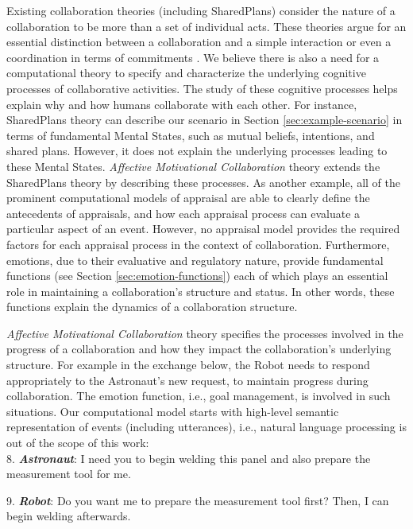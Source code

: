 \documentclass[12pt]{report}
\begin{document}
Existing collaboration theories (including SharedPlans) consider the nature of a
collaboration to be more than a set of individual acts. These theories argue for
an essential distinction between a collaboration and a simple interaction or
even a coordination in terms of commitments \cite{grosz:shared-plans,
lochbaum:collaborative-planning}. We believe there is also a need for a
computational theory to specify and characterize the underlying cognitive
processes of collaborative activities. The study of these cognitive processes
helps explain why and how humans collaborate with each other. For instance,
SharedPlans theory can describe our scenario in Section
\ref{sec:example-scenario} in terms of fundamental Mental States, such as mutual
beliefs, intentions, and shared plans. However, it does not explain the
underlying processes leading to these Mental States. \textit{Affective
Motivational Collaboration} theory extends the SharedPlans theory by describing
these processes. {\color{red}As another example, all of the prominent
computational models of appraisal are able to clearly define the antecedents of
appraisals, and how each appraisal process can evaluate a particular aspect of
an event. However, no appraisal model provides the required factors for each
appraisal process in the context of collaboration.} Furthermore, emotions, due
to their evaluative and regulatory nature, provide fundamental functions (see
Section \ref{sec:emotion-functions}) each of which plays an essential role in
maintaining a collaboration's structure and status. In other words, these
functions explain the dynamics of a collaboration structure.

\textit{Affective Motivational Collaboration} theory specifies the processes
involved in the progress of a collaboration and how they impact the
collaboration's underlying structure. For example in the exchange below, the
Robot needs to respond appropriately to the Astronaut's new request, to maintain
progress during collaboration. The emotion function, i.e., goal management, is
involved in such situations. {\color{red}Our computational model starts with
high-level semantic representation of events (including utterances), i.e.,
natural language processing is out of the scope of this work:}\\

  8. \textbf{\textit{Astronaut}}: I need you to begin welding this panel and also
  prepare the measurement tool for me.

  9. \textbf{\textit{Robot}}: Do you want me to prepare the measurement tool
  first? Then, I can begin welding afterwards.\\
\end{document}
